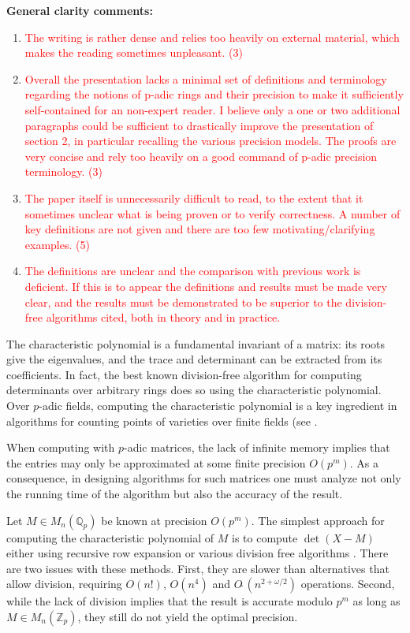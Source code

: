 \documentclass{sig-alternate-05-2015}
\newcommand{\Z}{\mathbb Z}
\newcommand{\Zp}{\Z_p}
\newcommand{\Q}{\mathbb Q}
\newcommand{\Qp}{\Q_p}
\newcommand{\softO}{O\tilde{~}}
\def\todo#1{\ \!\!{\color{red} #1}}
\newcommand{\tdo}[1]{\textcolor{red}{#1}}
\begin{document}
\textbf{General clarity comments:}
\begin{enumerate}
\item \tdo{The writing is rather dense and relies too heavily on external material, which makes the reading sometimes unpleasant. (3)}
\item \tdo{Overall the presentation lacks a minimal set of definitions and terminology regarding the notions of p-adic rings and their precision to make it sufficiently self-contained for an non-expert reader. I believe only a one or two additional paragraphs could be sufficient to drastically improve the presentation of section 2, in particular recalling the various precision models.  The proofs are very concise and rely too heavily on a good command of p-adic precision terminology. (3)}
\item \tdo{The paper itself is unnecessarily difficult to read, to the extent that it sometimes unclear what is being proven or to verify correctness.  A number of key definitions are not given and there are too few motivating/clarifying examples. (5)}
\item \tdo{The definitions are unclear and the comparison with previous work is deficient.  If this is to appear the definitions and results must be made very clear, and the results must be demonstrated to be superior to the division-free algorithms cited, both in theory and in practice.}
\end{enumerate}

The characteristic polynomial is a fundamental invariant of a matrix: its roots
give the eigenvalues, and the trace and determinant can be extracted from its coefficients.
In fact, the best known division-free algorithm for computing determinants
over arbitrary rings \cite{kaltofen-villard:04a} does so using the characteristic polynomial.
Over $p$-adic fields, computing the characteristic polynomial is a key ingredient in
algorithms for counting points of varieties over finite fields (see
\cite{kedlaya:01a, harvey:07a, harvey:14a}.


When computing with $p$-adic matrices, the lack of infinite memory implies
that the entries may only be approximated at some finite precision $O(p^m)$.  As a
consequence, in designing algorithms for such matrices one must analyze
not only the running time of the algorithm but also the accuracy of the result.

Let $M \in M_n(\Qp)$ be known at precision $O(p^m)$.
The simplest approach for computing the characteristic polynomial of $M$
is to compute $\det(X-M)$ either using recursive row expansion or various division free
algorithms .  There are two issues
with these methods.  First, they are slower than alternatives that allow division,
requiring $O(n!)$, $O(n^4)$ and $\softO(n^{2 + \omega/2})$ operations.  Second,
while the lack of division implies that the result is accurate modulo $p^m$ as
long as $M \in M_n(\Zp)$, they still do not yield the optimal precision.
\end{document}
